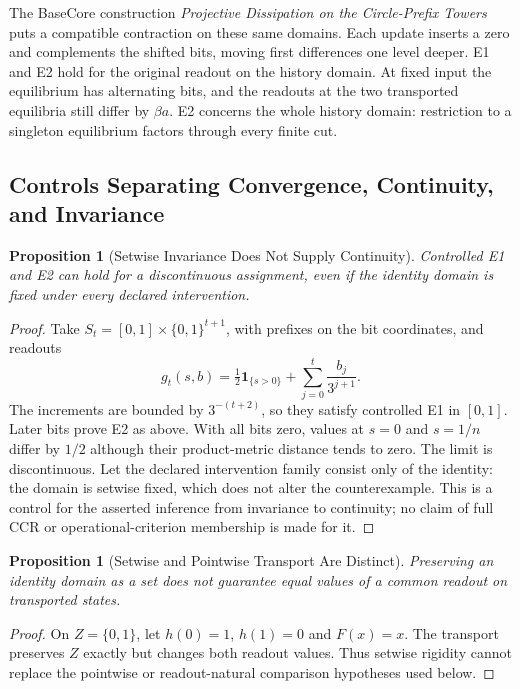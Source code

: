 \documentclass[11pt,a4paper]{article}
\theoremstyle{plain}
\newtheorem{proposition}[theorem]{Proposition}
\theoremstyle{definition}
\theoremstyle{remark}
\begin{document}
The BaseCore construction \emph{Projective Dissipation on the Circle-Prefix Towers} puts a compatible contraction on these same domains. Each update inserts a zero and complements the shifted bits, moving first differences one level deeper. E1 and E2 hold for the original readout on the history domain. At fixed input the equilibrium has alternating bits, and the readouts at the two transported equilibria still differ by $\beta a$. E2 concerns the whole history domain: restriction to a singleton equilibrium factors through every finite cut.


\subsection{Controls Separating Convergence, Continuity, and Invariance}

\begin{proposition}[Setwise Invariance Does Not Supply Continuity]\label{prop:readout-continuity-control}
Controlled E1 and E2 can hold for a discontinuous assignment, even if the identity domain is fixed under every declared intervention.
\end{proposition}

\begin{proof}
Take $S_t=[0,1]\times\{0,1\}^{t+1}$, with prefixes on the bit coordinates, and readouts
\[
g_t(s,b)=\tfrac12\mathbf1_{\{s>0\}}+\sum_{j=0}^t\frac{b_j}{3^{j+1}}.
\]
The increments are bounded by $3^{-(t+2)}$, so they satisfy controlled E1 in $[0,1]$. Later bits prove E2 as above. With all bits zero, values at $s=0$ and $s=1/n$ differ by $1/2$ although their product-metric distance tends to zero. The limit is discontinuous. Let the declared intervention family consist only of the identity: the domain is setwise fixed, which does not alter the counterexample. This is a control for the asserted inference from invariance to continuity; no claim of full CCR or operational-criterion membership is made for it.
\end{proof}

\begin{proposition}[Setwise and Pointwise Transport Are Distinct]\label{prop:transport-control}
Preserving an identity domain as a set does not guarantee equal values of a common readout on transported states.
\end{proposition}

\begin{proof}
On $Z=\{0,1\}$, let $h(0)=1$, $h(1)=0$ and $F(x)=x$. The transport preserves $Z$ exactly but changes both readout values. Thus setwise rigidity cannot replace the pointwise or readout-natural comparison hypotheses used below.
\end{proof}
\end{document}
